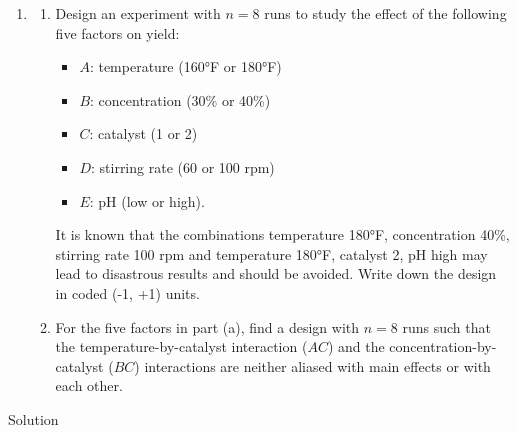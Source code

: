 \documentclass[
]{book}
\providecommand{\tightlist}{%
  \setlength{\itemsep}{0pt}\setlength{\parskip}{0pt}}
\theoremstyle{definition}
\theoremstyle{definition}
\theoremstyle{definition}
\theoremstyle{definition}
\theoremstyle{remark}
\begin{document}
\begin{enumerate}
\def\labelenumi{\arabic{enumi}.}
\setcounter{enumi}{2}
\item
  \begin{enumerate}
  \def\labelenumii{\alph{enumii}.}
  \item
    Design an experiment with \(n=8\) runs to study the effect of the following five factors on yield:

    \begin{itemize}
    \tightlist
    \item
      \(A\): temperature (160°F or 180°F)
    \item
      \(B\): concentration (30\% or 40\%)
    \item
      \(C\): catalyst (1 or 2)
    \item
      \(D\): stirring rate (60 or 100 rpm)
    \item
      \(E\): pH (low or high).
    \end{itemize}

    It is known that the combinations temperature 180°F, concentration 40\%, stirring rate 100 rpm and temperature 180°F, catalyst 2, pH high may lead to disastrous results and should be avoided. Write down the design in coded (-1, +1) units.
  \item
    For the five factors in part (a), find a design with \(n=8\) runs such that the temperature-by-catalyst interaction (\(AC\)) and the concentration-by-catalyst (\(BC\)) interactions are neither aliased with main effects or with each other.
  \end{enumerate}
\end{enumerate}

Solution
\end{document}
